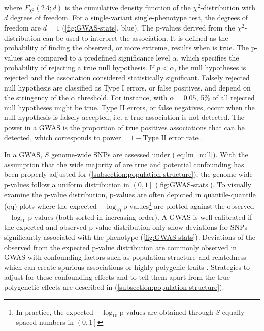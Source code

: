 where \(F_{\chi^2}\left(2\Lambda; d\right)\) is the cumulative density function of the \(\chi^2\)-distribution with \(d\) degrees of freedom. For a single-variant single-phenotype test, the degrees of freedom are \(d=1\) (\cref{fig:GWAS-stats}, blue). The p-values derived from the \(\chi^2\)-distribution can be used to interpret the association. It is defined as the probability of finding the observed, or more extreme, results when \tnullH is true. The p-values are compared to a predefined significance level \(\alpha\), which specifies the probability of rejecting a true null hypothesis. If \(p < \alpha\), the null hypotheses is rejected and the association considered statistically significant. Falsely rejected null hypothesis are classified as Type I errors, or false positives, and depend on the stringency of the \(\alpha\) threshold. For instance, with  \(\alpha=0.05\), 5\% of all rejected null hypotheses might be true. Type II errors, or false negatives, occur when the null hypothesis is falsely accepted, i.e. a true association is not detected. The power in a GWAS is the proportion of true positives associations that can be detected, which corresponds to \(\text{power} = 1 - \text{Type II error rate}\)  \citep{Krzywinski2013a,Krzywinski2013b}.

In a GWAS, \(S\) genome-wide SNPs are assessed under \tnullH (\cref{eq:lm_null}). With the assumption that the wide majority of \tnullH are true and potential confounding has been properly adjusted for (\cref{subsection:population-structure}), the genome-wide p-values follow a uniform distribution in \(\left(0,1\right]\) (\cref{fig:GWAS-stats}). To visually examine the p-value distribution, p-values are often depicted in quantile-quantile (qq) plots where the expected \(-\log_{10} \text{p-values}\)\footnote{In practice, the expected \(-\log_{10} \text{p-values}\) are obtained through \(S\) equally spaced numbers in \(\left(0,1\right]\)} are plotted against the observed \(-\log_{10} \text{p-values}\) (both sorted in increasing order). A GWAS is well-calibrated if the expected and observed p-value distribution only show deviations for SNPs significantly associated with the phenotype (\cref{fig:GWAS-stats}). Deviations of the observed from the expected p-value distribution are commonly observed in GWAS with confounding factors such as population structure and relatedness which can create spurious associations or highly polygenic traits \citep{Spielman1993,Lander1994,Marchini2004,Balding2006}. Strategies to adjust for these confounding effects and to tell them apart from the true polygenetic effects are described in (\cref{subsection:population-structure}). 

